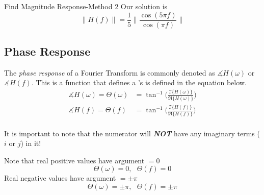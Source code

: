 \begin{example}[]{Find Magnitude Response-Method 2}
  Our solution is
  \begin{equation*}
    \lVert H(f) \rVert = \frac{1}{5} \Biggl\lVert \frac{\cos(5\pi f)}{\cos(\pi f)} \Biggr\rVert
  \end{equation*}
\end{example}

\subsection{Phase Response}\label{subsec:Fourier_Phase_Response}
\begin{definition}\label{def:Fourier_Phase_Response}
  The \emph{phase response} of a Fourier Transform is commonly denoted as $\measuredangle H(\omega)$ or $\measuredangle H(f)$.
  This is a function that defines a 's  is defined in the equation below.
  \begin{equation}\label{eq:Fourier_Phase_Response}
    \begin{aligned}
      \measuredangle H(\omega) = \Theta (\omega) &= \tan^{-1} \Biggl( \frac{\Im \lbrace H(\omega) \rbrace}{\Re \lbrace H(\omega) \rbrace} \Biggr) \\
      \measuredangle H(f) = \Theta (f) &= \tan^{-1} \Biggl( \frac{\Im \lbrace H(f) \rbrace}{\Re \lbrace H(f) \rbrace} \Biggr) \\
    \end{aligned}
  \end{equation}

  \begin{remark}
    It is important to note that the numerator will \textbf{\emph{NOT}} have any imaginary terms ($i$ or $j$) in it!
  \end{remark}

  \begin{remark}
    Note that real positive values have argument $=0$
    \begin{equation}\label{eq:Fourier_Phase_Response-Real_Positive_Values}
      \Theta(\omega) = 0,\:\:\: \Theta(f) = 0
    \end{equation}
    Real negative values have argument $=\pm \pi$
    \begin{equation}\label{eq:Fourier_Phase_Response-Real_Negative_Values}
      \Theta(\omega) = \pm \pi,\:\:\: \Theta(f) = \pm \pi
    \end{equation}
  \end{remark}


\end{definition}
